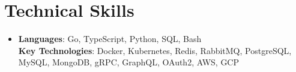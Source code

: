 \documentclass[letterpaper,11pt]{article}
\newcommand{\resumeSubHeadingListStart}{\begin{itemize}[leftmargin=0.15in, label={}, itemsep=0pt]}
\newcommand{\resumeSubHeadingListEnd}{\end{itemize}\vspace{-8pt}}
\begin{document}
\section{Technical Skills}
 \resumeSubHeadingListStart
    \vspace{-2pt}\item
    \small{
     \textbf{Languages}{: Go, TypeScript, Python, SQL, Bash} \\
     \textbf{Key Technologies}{: Docker, Kubernetes, Redis, RabbitMQ, PostgreSQL, MySQL, MongoDB, gRPC, GraphQL, OAuth2, AWS, GCP}
    }
 \resumeSubHeadingListEnd

\end{document}
